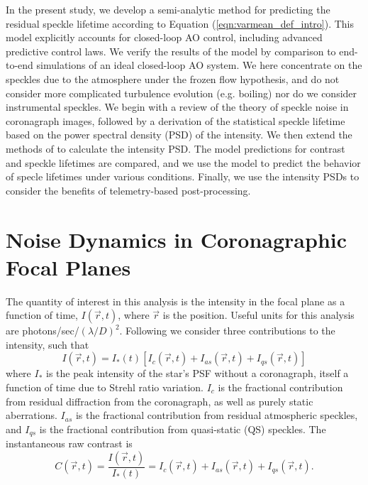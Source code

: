 \documentclass[10pt,preprint]{aastex631}
\begin{document}
In the present study, we develop a semi-analytic method for predicting the residual speckle lifetime according to Equation (\ref{eqn:varmean_def_intro}).  This model explicitly accounts for closed-loop AO control, including advanced predictive control laws.  We verify the results of the model by comparison to end-to-end simulations of an ideal closed-loop AO system.  We here concentrate on the speckles due to the atmosphere under the frozen flow hypothesis, and do not consider more complicated turbulence evolution (e.g. boiling) nor do we consider instrumental speckles. We begin with a review of the theory of speckle noise in coronagraph images, followed by a derivation of the statistical speckle lifetime based on the power spectral density (PSD) of the intensity.  We then extend the methods of \citet{2018JATIS...4a9001M} to calculate the intensity PSD.  The model predictions for contrast and speckle lifetimes are compared, and we use the model to predict the behavior of specle lifetimes under various conditions.  Finally, we use the intensity PSDs to consider the benefits of telemetry-based post-processing.


\section{Noise Dynamics in Coronagraphic Focal Planes}

The quantity of interest in this analysis is the intensity in the focal plane as a function of time, $I(\vec{r}, t)$, where $\vec{r}$ is the position.  Useful units for this analysis are photons/sec/$(\lambda/D)^2$.  Following \citet{2007ApJ...669..642S} we consider three contributions to the intensity, such that
\begin{equation}
I(\vec{r},t) = I_{*}(t)\left[I_c(\vec{r},t) + I_{as}(\vec{r},t) + I_{qs}(\vec{r},t)\right]
\end{equation}
where $I_{*}$ is the peak intensity of the star's PSF without a coronagraph, itself a function of time due to Strehl ratio variation.  $I_c$ is the fractional contribution from residual diffraction from the coronagraph, as well as purely static aberrations.  $I_{as}$ is the fractional contribution from residual atmospheric speckles, and $I_{qs}$ is the fractional contribution from quasi-static (QS) speckles.  The instantaneous raw contrast is
\begin{equation}
C(\vec{r},t) = \frac{I(\vec{r},t)}{I_*(t)} = I_c(\vec{r},t) + I_{as}(\vec{r},t) + I_{qs}(\vec{r},t).
\end{equation}
\end{document}

